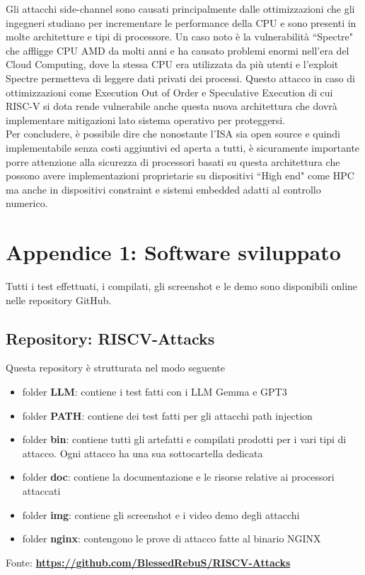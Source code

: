 \newline
Gli attacchi side-channel sono causati principalmente dalle ottimizzazioni che gli ingegneri studiano per incrementare le performance della CPU e sono presenti in molte architetture e tipi di processore. Un caso noto è la vulnerabilità ``Spectre" che affligge CPU AMD da molti anni e ha causato problemi enormi nell'era del Cloud Computing, dove la stessa CPU era utilizzata da più utenti e l'exploit Spectre permetteva di leggere dati privati dei processi. Questo attacco in caso di ottimizzazioni come Execution Out of Order e Speculative Execution di cui RISC-V si dota rende vulnerabile anche questa nuova architettura che dovrà implementare mitigazioni lato sistema operativo per proteggersi.\\
\newline
Per concludere, è possibile dire che nonostante l'ISA sia open source e quindi implementabile senza costi aggiuntivi ed aperta a tutti, è sicuramente importante porre attenzione alla sicurezza di processori basati su questa architettura che possono avere implementazioni proprietarie su dispositivi ``High end" come HPC ma anche in dispositivi constraint e sistemi embedded adatti al controllo numerico. 
\newpage
\section*{Appendice 1: Software sviluppato}
Tutti i test effettuati, i compilati, gli screenshot e le demo sono disponibili online nelle repository GitHub.
\subsection*{Repository: RISCV-Attacks}
Questa repository è strutturata nel modo seguente
\begin{itemize}
\item folder \textbf{LLM}: contiene i test fatti con i LLM Gemma e GPT3
\item folder \textbf{PATH}: contiene dei test fatti per gli attacchi path injection
\item folder \textbf{bin}: contiene tutti gli artefatti e compilati prodotti per i vari tipi di attacco. Ogni attacco ha una sua sottocartella dedicata
\item folder \textbf{doc}: contiene la documentazione e le risorse relative ai processori attaccati
\item folder \textbf{img}: contiene gli screenshot e i video demo degli attacchi
\item folder \textbf{nginx}: contengono le prove di attacco fatte al binario NGINX
\end{itemize}
Fonte: \href{https://github.com/BlessedRebuS/RISCV-Attacks}{\textbf{https://github.com/BlessedRebuS/RISCV-Attacks}}
